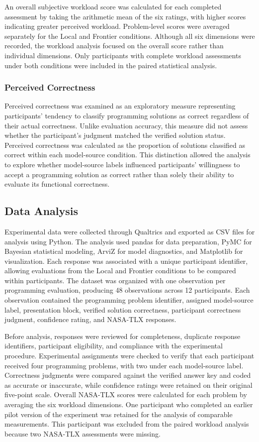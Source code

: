 \documentclass[manuscript,review]{acmart}
\begin{document}
An overall subjective workload score was calculated for each completed assessment by taking the arithmetic mean of the six ratings, with higher scores indicating greater perceived workload. Problem-level scores were averaged separately for the Local and Frontier conditions. Although all six dimensions were recorded, the workload analysis focused on the overall score rather than individual dimensions. Only participants with complete workload assessments under both conditions were included in the paired statistical analysis.

\subsubsection{Perceived Correctness}

Perceived correctness was examined as an exploratory measure representing participants' tendency to classify programming solutions as correct regardless of their actual correctness. Unlike evaluation accuracy, this measure did not assess whether the participant's judgment matched the verified solution status. Perceived correctness was calculated as the proportion of solutions classified as correct within each model-source condition. This distinction allowed the analysis to explore whether model-source labels influenced participants' willingness to accept a programming solution as correct rather than solely their ability to evaluate its functional correctness.


\subsection{Data Analysis}
Experimental data were collected through Qualtrics and exported as CSV files for analysis using Python. The analysis used pandas for data preparation, PyMC for Bayesian statistical modeling, ArviZ for model diagnostics, and Matplotlib for visualization. Each response was associated with a unique participant identifier, allowing evaluations from the Local and Frontier conditions to be compared within participants. The dataset was organized with one observation per programming evaluation, producing 48 observations across 12 participants. Each observation contained the programming problem identifier, assigned model-source label, presentation block, verified solution correctness, participant correctness judgment, confidence rating, and NASA-TLX responses.

Before analysis, responses were reviewed for completeness, duplicate response identifiers, participant eligibility, and compliance with the experimental procedure. Experimental assignments were checked to verify that each participant received four programming problems, with two under each model-source label. Correctness judgments were compared against the verified answer key and coded as accurate or inaccurate, while confidence ratings were retained on their original five-point scale. Overall NASA-TLX scores were calculated for each problem by averaging the six workload dimensions. One participant who completed an earlier pilot version of the experiment was retained for the analysis of comparable measurements. This participant was excluded from the paired workload analysis because two NASA-TLX assessments were missing.
\end{document}
